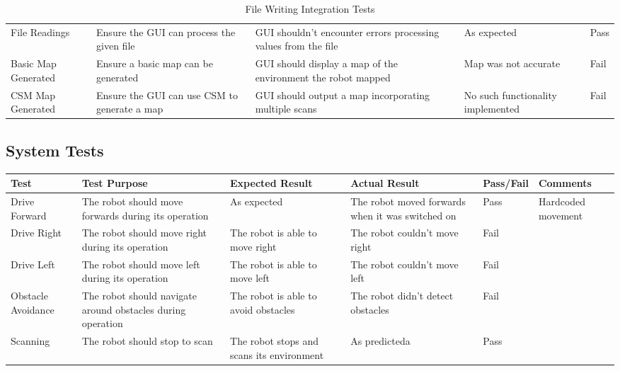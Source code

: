 \begin{landscape}
\begin{table}[h!]
\begin{tabular}{| p{2.5cm} | p{5cm} | p{4cm} | p{3cm} | p{1.5cm} |}
							File Readings & Ensure the GUI can process the given file & GUI shouldn't encounter errors processing values from the file & As expected & Pass \\
							
							Basic Map Generated & Ensure a basic map can be generated  & GUI should display a map of the environment the robot mapped & Map was not accurate & Fail \\ 
							
							CSM Map Generated & Ensure the GUI can use CSM to generate a map  & GUI should output a map incorporating multiple scans & No such functionality implemented & Fail \\ [1ex] 
							\hline
						\end{tabular}
						\caption{File Writing Integration Tests}
						\label{table:mappingtests}		
					\end{table}
				
				\subsection{System Tests}
				\begin{table}[h!]
					\centering
					\begin{tabular}{| p{2.5cm} | p{5cm} | p{4cm} | p{4cm} | p{1.5cm} | p{2cm} |} 
						\hline
						Test & Test Purpose & Expected Result & Actual Result & Pass/Fail & Comments \\ [0.5ex] 
						\hline
						Drive Forward & The robot should move forwards during its operation & As expected & The robot moved forwards when it was switched on & Pass & Hardcoded movement  \\
							
						Drive Right & The robot should move right during its operation & The robot is able to move right & The robot couldn't move right & Fail &   \\
							
						Drive Left & The robot should move left during its operation & The robot is able to move left & The robot couldn't move left & Fail &   \\
						
						Obstacle Avoidance & The robot should navigate around obstacles during operation & The robot is able to avoid obstacles & The robot didn't detect obstacles & Fail &   \\
							
						Scanning & The robot should stop to scan & The robot stops and scans its environment & As predicteda & Pass &   \\ 
							

\end{tabular}
\end{table}
\end{landscape}
